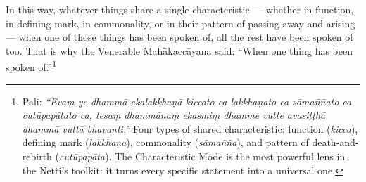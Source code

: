 \ornament

In this way, whatever things share a single characteristic --- whether in function, in defining mark, in commonality, or in their pattern of passing away and arising --- when one of those things has been spoken of, all the rest have been spoken of too. That is why the Venerable Mahākaccāyana said: ``When one thing has been spoken of.''\footnote{Pali: \textit{``Evaṃ ye dhammā ekalakkhaṇā kiccato ca lakkhaṇato ca sāmaññato ca cutūpapātato ca, tesaṃ dhammānaṃ ekasmiṃ dhamme vutte avasiṭṭhā dhammā vuttā bhavanti.''} Four types of shared characteristic: function (\textit{kicca}), defining mark (\textit{lakkhaṇa}), commonality (\textit{sāmañña}), and pattern of death-and-rebirth (\textit{cutūpapāta}). The Characteristic Mode is the most powerful lens in the Netti's toolkit: it turns every specific statement into a universal one.}
